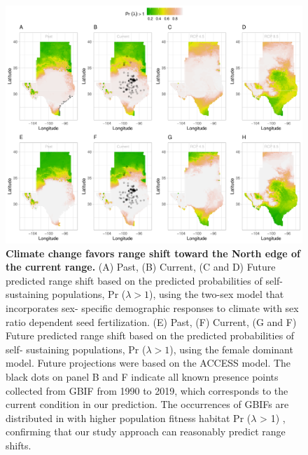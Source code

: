 \documentclass[12pt]{article}
\begin{document}
\begin{figure}[H]
  \begin{center}
    \includegraphics[width=0.99\linewidth]{Figures/Fig_geoPrlambdaacc.pdf}
  \caption{ \textbf{Climate change favors range shift toward the North edge of the current range.}
  (A) Past, (B) Current, (C and D) Future predicted range shift based on the predicted probabilities of self- sustaining populations, Pr ($\lambda > 1$), using the two-sex model that incorporates sex- specific demographic responses to climate with sex ratio dependent seed fertilization.
  (E) Past, (F) Current, (G and F) Future  predicted range shift based on the predicted probabilities of self- sustaining populations, Pr ($\lambda > 1$), using the female dominant model.
  Future projections were based on the ACCESS model.
  The black dots on panel B and F indicate all known presence points collected from GBIF from 1990 to 2019, which corresponds to the current condition in our prediction. 
  The occurrences of GBIFs are distributed in with higher population fitness habitat Pr ($\lambda$ > 1) , confirming that our study approach can reasonably predict range shifts. }
  \label{fig:geoprojacc}
  \end{center}
\end{figure}
\end{document}
